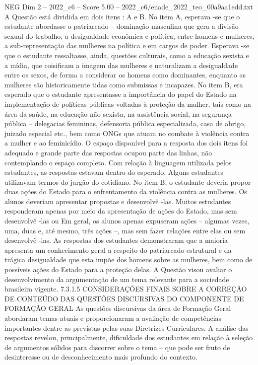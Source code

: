 \begin{textsample}{NEG Dim 2 – 2022\_c6 – Score 5.00 – 2022\_c6/enade\_2022\_teo\_00a9aa1edd.txt}
A Questão está dividida em dois itens : A e B.
No item A, esperava -se que o estudante abordasse o patriarcado – dominação masculina que gera a divisão sexual do trabalho, a desigualdade econômica e política, entre homens e mulheres, a sub-representação das mulheres na política e em cargos de poder.
Esperava -se que o estudante ressaltasse, ainda, questões culturais, como a educação sexista e a mídia, que coisificam a imagem das mulheres e naturalizam a desigualdade entre os sexos, de forma a considerar os homens como dominantes, enquanto as mulheres são historicamente tidas como submissas e incapazes.
No item B, era esperado que o estudante apresentasse a importância do papel do Estado na implementação de políticas públicas voltadas à proteção da mulher, tais como na área da saúde, na educação não sexista, na assistência social, na segurança pública – delegacias femininas, defensoria pública especializada, casa de abrigo, juizado especial etc., bem como ONGs que atuam no combate à violência contra a mulher e ao feminicídio.
O espaço disponível para a resposta dos dois itens foi adequado e grande parte das respostas ocupou parte das linhas, não contemplando o espaço completo.
Com relação à linguagem utilizada pelos estudantes, as respostas estavam dentro do esperado.
Alguns estudantes utilizavam termos do jargão do cotidiano.
No item B, o estudante deveria propor duas ações do Estado para o enfrentamento da violência contra as mulheres.
Os alunos deveriam apresentar propostas e desenvolvê -las.
Muitos estudantes responderam apenas por meio da apresentação de ações do Estado, mas sem desenvolvê -las ou Em geral, os alunos apenas expuseram ações – algumas vezes, uma, duas e, até mesmo, três ações –, mas sem fazer relações entre elas ou sem desenvolvê -las.
As respostas dos estudantes demonstraram que a maioria apresenta um conhecimento geral a respeito do patriarcado estrutural e da trágica desigualdade que esta impõe dos homens sobre as mulheres, bem como de possíveis ações do Estado para a proteção delas.
A Questão visou avaliar o desenvolvimento da argumentação de um tema relevante para a sociedade brasileira vigente. 7.3.1.5 CONSIDERAÇÕES FINAIS SOBRE A CORREÇÃO DE CONTEÚDO DAS QUESTÕES DISCURSIVAS DO COMPONENTE DE FORMAÇÃO GERAL As questões discursivas da área de Formação Geral abordaram temas atuais e proporcionaram a avaliação de competências importantes dentre as previstas pelas suas Diretrizes Curriculares.
A análise das respostas revelou, principalmente, dificuldade dos estudantes em relação à seleção de argumentos sólidos para discorrer sobre o tema – que pode ser fruto de desinteresse ou de desconhecimento mais profundo do contexto.

\end{textsample}
